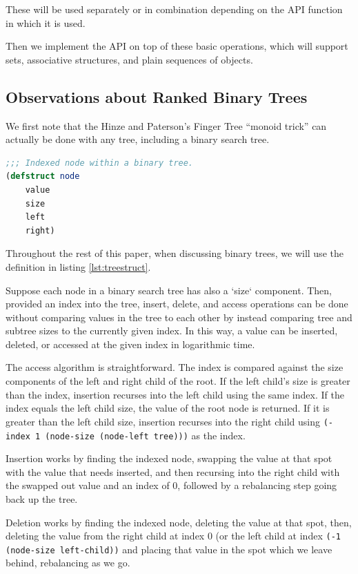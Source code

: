 \documentclass[sigconf]{acmart}
\begin{document}
These will be used separately or in combination depending on the API function in
which it is used.

Then we implement the API on top of these basic operations, which will support
sets, associative structures, and plain sequences of objects.

\subsection{Observations about Ranked Binary Trees}

We first note that the Hinze and Paterson's Finger Tree ``monoid
trick''\cite{Hinze-Paterson:FingerTree} can actually be done with any tree,
including a binary search tree.

\begin{lstlisting}[caption={Our indexed binary tree type.}, label={lst:treestruct}, language=Lisp]
;;; Indexed node within a binary tree.
(defstruct node
    value
    size
    left
    right)
\end{lstlisting}

Throughout the rest of this paper, when discussing binary trees, we will use
the definition in listing \ref{lst:treestruct}.

Suppose each node in a binary search tree has also a `size` component. Then,
provided an index into the tree, insert, delete, and access operations can
be done without comparing values in the tree to each other by instead comparing
tree and subtree sizes to the currently given index. In this way, a value
can be inserted, deleted, or accessed at the given index in logarithmic time.

The access algorithm is straightforward. The index is compared against the size
components of the left and right child of the root. If the left child's size
is greater than the index, insertion recurses into the left child using the same
index. If the index equals the left child size, the value of the root node is returned.
If it is greater than the left child size, insertion recurses into the right
child using \texttt{(- index 1 (node-size (node-left tree)))} as the index.

Insertion works by finding the indexed node, swapping the value at that spot
with the value that needs inserted, and then recursing into the right child with
the swapped out value and an index of 0, followed by a rebalancing step going
back up the tree.

Deletion works by finding the indexed node, deleting the value at that spot,
then, deleting the value from the right child at index 0 (or the left child at
index \texttt{(-1 (node-size left-child))} and placing that value in the spot
which we leave behind, rebalancing as we go.
\end{document}

